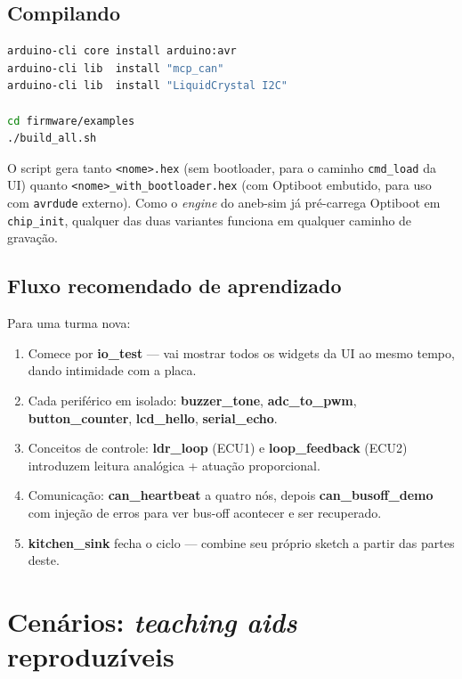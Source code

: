 \documentclass[12pt,a4paper]{article}
\begin{document}
\subsection{Compilando}

\begin{lstlisting}[language=bash]
arduino-cli core install arduino:avr
arduino-cli lib  install "mcp_can"
arduino-cli lib  install "LiquidCrystal I2C"

cd firmware/examples
./build_all.sh
\end{lstlisting}

O script gera tanto \texttt{<nome>.hex} (sem bootloader, para o caminho
\texttt{cmd\_load} da UI) quanto \texttt{<nome>\_with\_bootloader.hex}
(com Optiboot embutido, para uso com \texttt{avrdude} externo). Como o
\emph{engine} do aneb-sim já pré-carrega Optiboot em \texttt{chip\_init},
qualquer das duas variantes funciona em qualquer caminho de gravação.

\subsection{Fluxo recomendado de aprendizado}

Para uma turma nova:

\begin{enumerate}[nosep]
  \item Comece por \textbf{io\_test} --- vai mostrar todos os widgets
        da UI ao mesmo tempo, dando intimidade com a placa.
  \item Cada periférico em isolado: \textbf{buzzer\_tone},
        \textbf{adc\_to\_pwm}, \textbf{button\_counter},
        \textbf{lcd\_hello}, \textbf{serial\_echo}.
  \item Conceitos de controle: \textbf{ldr\_loop} (ECU1) e
        \textbf{loop\_feedback} (ECU2) introduzem leitura analógica
        + atuação proporcional.
  \item Comunicação: \textbf{can\_heartbeat} a quatro nós, depois
        \textbf{can\_busoff\_demo} com injeção de erros para ver
        bus-off acontecer e ser recuperado.
  \item \textbf{kitchen\_sink} fecha o ciclo --- combine seu próprio
        sketch a partir das partes deste.
\end{enumerate}

\section{Cenários: \emph{teaching aids} reproduzíveis}
\end{document}
